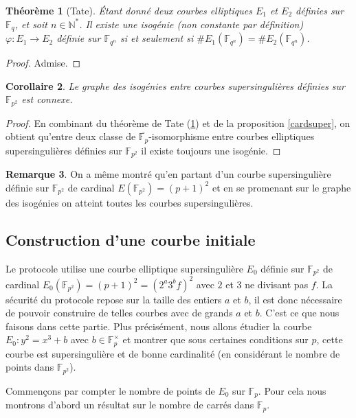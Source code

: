 \documentclass{article}
\theoremstyle{plain}%
\newtheorem{thm}{Théorème}[section]
\newtheorem{cor}[thm]{Corollaire}
\theoremstyle{definition}%
\newtheorem{rem}[thm]{Remarque}
\newcommand{\F}{\mathbb{F}}
\newcommand{\N}{\mathbb{N}}
\begin{document}
\begin{thm}[Tate]
  \label{tate}
Étant donné deux courbes elliptiques $E_1$ et $E_2$ définies sur $\F_{q}$, et soit $n\in\N^*$. Il existe une isogénie (non constante par définition) $\varphi : E_1 \to E_2$ définie sur $\F_{q^n}$ si et seulement si $\# E_1(\F_{q^n}) = \# E_2(\F_{q^n})$. 
\end{thm}

\begin{proof}
  Admise.
\end{proof}


\begin{cor}
  Le graphe des isogénies entre courbes supersingulières définies sur $\F_{p^2}$ est connexe.
\end{cor}

\begin{proof}
  En combinant du théorème de Tate (\ref{tate}) et de la proposition \ref{cardsuper}, on obtient qu'entre deux classe de $\overline{\F_p}$-isomorphisme entre courbes elliptiques supersingulières définies sur $\F_{p^2}$ il existe toujours une isogénie.
\end{proof}

\begin{rem}
  On a même montré qu'en partant d'un courbe supersingulière définie sur $\F_{p^2}$ de cardinal $E(\F_{p^2}) = (p+1)^2$ et en se promenant sur le graphe des isogénies on atteint toutes les courbes supersingulières.
\end{rem}



\subsection{Construction d'une courbe initiale}
\label{init}

Le protocole utilise une courbe elliptique supersingulière $E_0$ définie sur $\F_{p^2}$ de cardinal $E_0(\F_{p^2}) = (p+1)^2 =(2^a3^bf)^2$ avec $2$ et $3$ ne divisant pas $f$. La sécurité du protocole repose sur la taille des entiers $a$ et $b$, il est donc nécessaire de pouvoir construire de telles courbes avec de grands $a$ et $b$. C'est ce que nous faisons dans cette partie.
Plus précisément, nous allons étudier la courbe $E_0 : y^2 = x^3 + b$ avec $b\in\F_{p}^\times$ et montrer que sous certaines conditions sur $p$, cette courbe est supersingulière et de bonne cardinalité (en considérant le nombre de points dans $\F_{p^2}$).


Commençons par compter le nombre de points de $E_0$ sur $\F_{p}$. Pour cela nous montrons d'abord un résultat sur le nombre de carrés dans $\F_{p}$.
\end{document}
